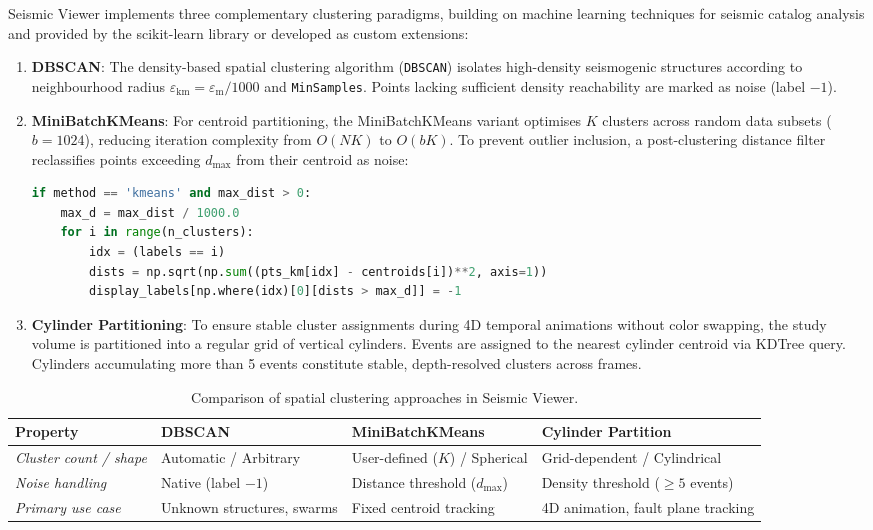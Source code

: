 Seismic Viewer implements three complementary clustering paradigms, building on machine learning techniques for seismic catalog analysis \cite{bergen2019machine} and provided by the scikit-learn library \cite{pedregosa2011sklearn} or developed as custom extensions:
\begin{enumerate}
    \item \textbf{DBSCAN}: The density-based spatial clustering algorithm \cite{ester1996dbscan} (\texttt{DBSCAN}) isolates high-density seismogenic structures according to neighbourhood radius $\varepsilon_\text{km} = \varepsilon_\text{m}/1000$ and \texttt{MinSamples}. Points lacking sufficient density reachability are marked as noise (label $-1$).
    \item \textbf{MiniBatchKMeans}: For centroid partitioning, the MiniBatchKMeans variant \cite{lloyd1982kmeans} optimises $K$ clusters across random data subsets ($b=1024$), reducing iteration complexity from $O(NK)$ to $O(bK)$. To prevent outlier inclusion, a post-clustering distance filter reclassifies points exceeding $d_\text{max}$ from their centroid as noise:
    \begin{lstlisting}[language=Python, caption={Post-clustering distance filter for KMeans.}, label={lst:kmeans-filter}]
if method == 'kmeans' and max_dist > 0:
    max_d = max_dist / 1000.0
    for i in range(n_clusters):
        idx = (labels == i)
        dists = np.sqrt(np.sum((pts_km[idx] - centroids[i])**2, axis=1))
        display_labels[np.where(idx)[0][dists > max_d]] = -1
    \end{lstlisting}
    \item \textbf{Cylinder Partitioning}: To ensure stable cluster assignments during 4D temporal animations without color swapping, the study volume is partitioned into a regular grid of vertical cylinders. Events are assigned to the nearest cylinder centroid via KDTree query. Cylinders accumulating more than 5 events constitute stable, depth-resolved clusters across frames.
\end{enumerate}

\begin{table}[htbp]
\centering
\caption{Comparison of spatial clustering approaches in Seismic Viewer.}
\label{tab:clustering-comparison}
\footnotesize
\renewcommand{\arraystretch}{1.15}
\begin{tabularx}{\textwidth}{@{}l >{\raggedright\arraybackslash}X >{\raggedright\arraybackslash}X >{\raggedright\arraybackslash}X@{}}
\toprule
\textbf{Property} & \textbf{DBSCAN} & \textbf{MiniBatchKMeans} & \textbf{Cylinder Partition} \\
\midrule
\textit{Cluster count / shape} & Automatic / Arbitrary & User-defined ($K$) / Spherical & Grid-dependent / Cylindrical \\
\addlinespace
\textit{Noise handling} & Native (label $-1$) & Distance threshold ($d_\text{max}$) & Density threshold ($\geq 5$ events) \\
\addlinespace
\textit{Primary use case} & Unknown structures, swarms & Fixed centroid tracking & 4D animation, fault plane tracking \\
\bottomrule
\end{tabularx}
\end{table}

